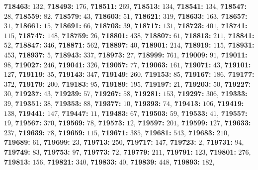\textsf{\bfseries 718463:} $132$, \textsf{\bfseries 718493:} $176$, \textsf{\bfseries 718511:} $269$, \textsf{\bfseries 718513:} $134$, \textsf{\bfseries 718541:} $134$, \textsf{\bfseries 718547:} $28$, \textsf{\bfseries 718559:} $82$, \textsf{\bfseries 718579:} $43$, \textsf{\bfseries 718603:} $51$, \textsf{\bfseries 718621:} $319$, \textsf{\bfseries 718633:} $163$, \textsf{\bfseries 718657:} $31$, \textsf{\bfseries 718661:} $15$, \textsf{\bfseries 718691:} $66$, \textsf{\bfseries 718703:} $39$, \textsf{\bfseries 718717:} $131$, \textsf{\bfseries 718723:} $401$, \textsf{\bfseries 718741:} $115$, \textsf{\bfseries 718747:} $148$, \textsf{\bfseries 718759:} $26$, \textsf{\bfseries 718801:} $438$, \textsf{\bfseries 718807:} $61$, \textsf{\bfseries 718813:} $211$, \textsf{\bfseries 718841:} $52$, \textsf{\bfseries 718847:} $346$, \textsf{\bfseries 718871:} $562$, \textsf{\bfseries 718897:} $40$, \textsf{\bfseries 718901:} $214$, \textsf{\bfseries 718919:} $115$, \textsf{\bfseries 718931:} $453$, \textsf{\bfseries 718937:} $5$, \textsf{\bfseries 718943:} $337$, \textsf{\bfseries 718973:} $27$, \textsf{\bfseries 718999:} $761$, \textsf{\bfseries 719009:} $91$, \textsf{\bfseries 719011:} $98$, \textsf{\bfseries 719027:} $246$, \textsf{\bfseries 719041:} $326$, \textsf{\bfseries 719057:} $77$, \textsf{\bfseries 719063:} $161$, \textsf{\bfseries 719071:} $43$, \textsf{\bfseries 719101:} $127$, \textsf{\bfseries 719119:} $35$, \textsf{\bfseries 719143:} $347$, \textsf{\bfseries 719149:} $260$, \textsf{\bfseries 719153:} $85$, \textsf{\bfseries 719167:} $186$, \textsf{\bfseries 719177:} $372$, \textsf{\bfseries 719179:} $200$, \textsf{\bfseries 719183:} $95$, \textsf{\bfseries 719189:} $195$, \textsf{\bfseries 719197:} $21$, \textsf{\bfseries 719203:} $50$, \textsf{\bfseries 719227:} $30$, \textsf{\bfseries 719237:} $43$, \textsf{\bfseries 719239:} $57$, \textsf{\bfseries 719267:} $58$, \textsf{\bfseries 719281:} $153$, \textsf{\bfseries 719297:} $306$, \textsf{\bfseries 719333:} $39$, \textsf{\bfseries 719351:} $38$, \textsf{\bfseries 719353:} $88$, \textsf{\bfseries 719377:} $10$, \textsf{\bfseries 719393:} $74$, \textsf{\bfseries 719413:} $106$, \textsf{\bfseries 719419:} $138$, \textsf{\bfseries 719441:} $147$, \textsf{\bfseries 719447:} $11$, \textsf{\bfseries 719483:} $67$, \textsf{\bfseries 719503:} $59$, \textsf{\bfseries 719533:} $41$, \textsf{\bfseries 719557:} $19$, \textsf{\bfseries 719567:} $370$, \textsf{\bfseries 719569:} $78$, \textsf{\bfseries 719573:} $12$, \textsf{\bfseries 719597:} $201$, \textsf{\bfseries 719599:} $127$, \textsf{\bfseries 719633:} $237$, \textsf{\bfseries 719639:} $78$, \textsf{\bfseries 719659:} $115$, \textsf{\bfseries 719671:} $385$, \textsf{\bfseries 719681:} $543$, \textsf{\bfseries 719683:} $210$, \textsf{\bfseries 719689:} $61$, \textsf{\bfseries 719699:} $23$, \textsf{\bfseries 719713:} $250$, \textsf{\bfseries 719717:} $147$, \textsf{\bfseries 719723:} $2$, \textsf{\bfseries 719731:} $94$, \textsf{\bfseries 719749:} $83$, \textsf{\bfseries 719753:} $97$, \textsf{\bfseries 719773:} $72$, \textsf{\bfseries 719779:} $211$, \textsf{\bfseries 719791:} $123$, \textsf{\bfseries 719801:} $276$, \textsf{\bfseries 719813:} $156$, \textsf{\bfseries 719821:} $340$, \textsf{\bfseries 719833:} $40$, \textsf{\bfseries 719839:} $448$, \textsf{\bfseries 719893:} $182$, 
